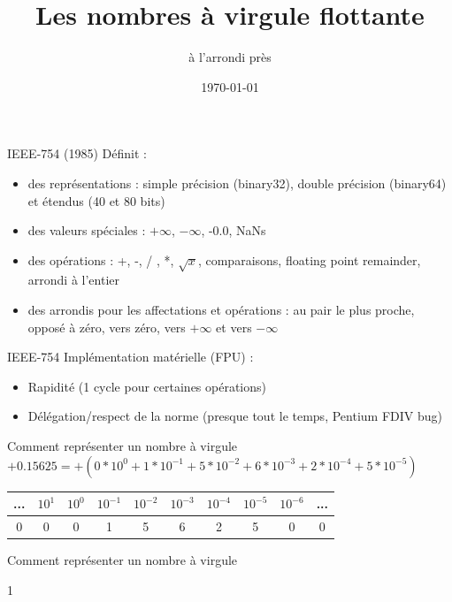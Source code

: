 \documentclass{beamer}
\title{Les nombres à virgule flottante}
\subtitle{à l'arrondi près}
\date{\today}
\begin{document}
  \maketitle
  \begin{frame}{IEEE-754 (1985)}
Définit :
    \begin{itemize}
      \item des représentations : simple précision (binary32), double précision (binary64) et étendus (40 et 80 bits)
      \item des valeurs spéciales : $+\infty$, $-\infty$, -0.0, NaNs
      \item des opérations : +, -, / , *, $\sqrt{x}$, comparaisons, floating point remainder, arrondi à l'entier
      \item des arrondis pour les affectations et opérations : au pair le plus proche, opposé à zéro, vers zéro, vers $+\infty$ et vers $-\infty$
    \end{itemize}
  \end{frame}
  
  \begin{frame}{IEEE-754}
    Implémentation matérielle (FPU) : 
    \begin{itemize}
      \item Rapidité (1 cycle pour certaines opérations)
      \item Délégation/respect de la norme (presque tout le temps, Pentium FDIV bug)
    \end{itemize}
  \end{frame}
  
  \begin{frame}{Comment représenter un nombre à virgule} 
    $+0.15625 = +(0*10^{0} + 1*10^{-1} + 5*10^{-2} + 6*10^{-3} + 2*10^{-4} + 5*10^{-5})$
    \begin{center}
      \begin{tabular}{|c|c|c|c|c|c|c|c|c|c|} \hline
        ... & $10^{1}$ & $10^{0}$ & $10^{-1}$ & $10^{-2}$ & $10^{-3}$ & $10^{-4}$ & $10^{-5}$ & $10^{-6}$ & ... \\ \hline
        0 & 0 & 0 & 1 & 5 & 6 & 2 & 5 & 0 & 0\\ \hline
      \end{tabular}
    \end{center}
  \end{frame}
  
  \begin{frame}{Comment représenter un nombre à virgule} 
    \begin{center}
\fontsize{100}{110} \hspace{1cm} 1
    \end{center}
  \end{frame}
  
\end{document}
